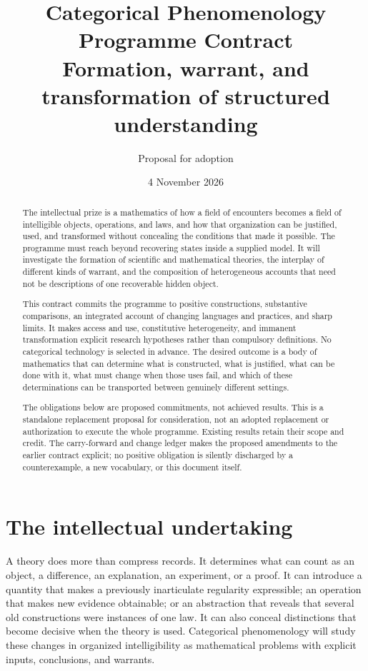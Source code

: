 \documentclass[11pt]{article}
\title{Categorical Phenomenology Programme Contract\\[4pt]\large Formation, warrant, and transformation of structured understanding}
\author{Proposal for adoption}
\date{4 November 2026}
\theoremstyle{definition}
\begin{document}
\maketitle

\begin{abstract}
The intellectual prize is a mathematics of how a field of encounters becomes a field of intelligible objects, operations, and laws, and how that organization can be justified, used, and transformed without concealing the conditions that made it possible. The programme must reach beyond recovering states inside a supplied model. It will investigate the formation of scientific and mathematical theories, the interplay of different kinds of warrant, and the composition of heterogeneous accounts that need not be descriptions of one recoverable hidden object.

This contract commits the programme to positive constructions, substantive comparisons, an integrated account of changing languages and practices, and sharp limits. It makes access and use, constitutive heterogeneity, and immanent transformation explicit research hypotheses rather than compulsory definitions. No categorical technology is selected in advance. The desired outcome is a body of mathematics that can determine what is constructed, what is justified, what can be done with it, what must change when those uses fail, and which of these determinations can be transported between genuinely different settings.

The obligations below are proposed commitments, not achieved results. This is a standalone replacement proposal for consideration, not an adopted replacement or authorization to execute the whole programme. Existing results retain their scope and credit. The carry-forward and change ledger makes the proposed amendments to the earlier contract explicit; no positive obligation is silently discharged by a counterexample, a new vocabulary, or this document itself.
\end{abstract}
\tableofcontents

\section{The intellectual undertaking}
\label{sec:undertaking}

A theory does more than compress records. It determines what can count as an object, a difference, an explanation, an experiment, or a proof. It can introduce a quantity that makes a previously inarticulate regularity expressible; an operation that makes new evidence obtainable; or an abstraction that reveals that several old constructions were instances of one law. It can also conceal distinctions that become decisive when the theory is used. Categorical phenomenology will study these changes in organized intelligibility as mathematical problems with explicit inputs, conclusions, and warrants.
\end{document}
